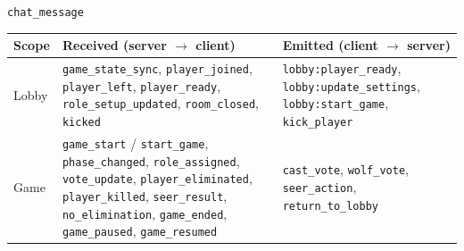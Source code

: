 \documentclass{scrartcl}
\begin{document}
\begin{table}\texttt{chat\_message}       
      \centering
      \small
      \begin{tabular}{@{}p{2.0cm}p{6.0cm}p{5.2cm}@{}}
            \toprule
            \textbf{Scope}                                                                                                                                                                                                                                                                                   & \textbf{Received (server $\to$ client)} & \textbf{Emitted (client $\to$ server)} \\
            \midrule
            Lobby                                                                                                                                                                                                                                                                                            &
            \texttt{game\_state\_sync}, \texttt{player\_joined}, \texttt{player\_left}, \texttt{player\_ready}, \texttt{role\_setup\_updated}, \texttt{room\_closed}, \texttt{kicked}                                                                                                                        &
            \texttt{lobby:player\_ready}, \texttt{lobby:update\_settings}, \texttt{lobby:start\_game}, \texttt{kick\_player}                                                                                                                                                                                                                                                                    \\
            \addlinespace
            Game                                                                                                                                                                                                                                                                                             &
            \texttt{game\_start} / \texttt{start\_game}, \texttt{phase\_changed}, \texttt{role\_assigned}, \texttt{vote\_update}, \texttt{player\_eliminated}, \texttt{player\_killed}, \texttt{seer\_result}, \texttt{no\_elimination}, \texttt{game\_ended}, \texttt{game\_paused}, \texttt{game\_resumed} &
            \texttt{cast\_vote}, \texttt{wolf\_vote}, \texttt{seer\_action}, \texttt{return\_to\_lobby}                                                                                                                                                                                                                                                                                         \\

\end{tabular}
\end{table}
\end{document}
